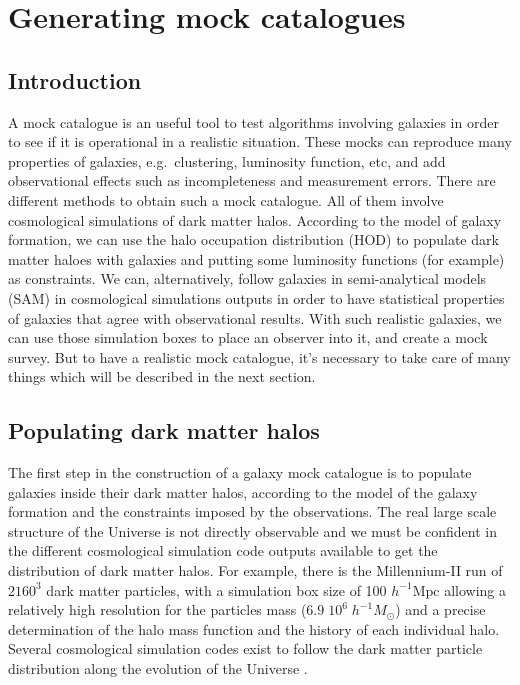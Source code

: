 \chapter{Generating mock catalogues}
\label{cha:mock}

\minitoc%

\section{Introduction}

A mock catalogue is an useful tool to test algorithms involving galaxies in
order to see if it is operational in a realistic situation. These mocks can
reproduce many properties of galaxies, e.g.\ clustering, luminosity function,
etc, and add observational effects such as incompleteness and measurement
errors. There are different methods to obtain such a mock catalogue. All of
them involve cosmological simulations of dark matter halos. According to the
model of galaxy formation, we can use the halo occupation distribution (HOD) to
populate dark matter haloes with galaxies and putting some luminosity functions
(for example) as constraints. We can, alternatively, follow galaxies in
semi-analytical models (SAM) in cosmological simulations outputs in order to
have statistical properties of galaxies that agree with observational results.
With such realistic galaxies, we can use those simulation boxes to place an
observer into it, and create a mock survey. But to have a realistic mock
catalogue, it's necessary to take care of many things which will be described
in the next section.

\section{Populating dark matter halos}
\label{sec:populating_dark_matter_halos}

The first step in the construction of a galaxy mock catalogue is to populate
galaxies inside their dark matter halos, according to the model of the galaxy
formation and the constraints imposed by the observations. The real large scale
structure of the Universe is not directly observable and we must be confident
in the different cosmological simulation code outputs available to get the
distribution of dark matter halos. For example, there is the Millennium-II run
\citep{BoylanKolchin+09} of $2160^3$ dark matter particles, with a simulation
box size of 100 $h^{-1} \mathrm{Mpc}$ allowing a relatively high resolution for
the particles mass ($6.9\;10^6\;h^{-1} M_\odot$) and a precise determination of
the halo mass function and the history of each individual halo. Several
cosmological simulation codes exist to follow the dark matter particle
distribution along the evolution of the Universe \citep{Springel+01,
Teyssier+02, Springel+05}.

